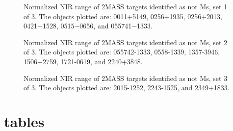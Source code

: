 \documentclass[12pt,preprint]{aastex}
\begin{document}

\begin{figure}
	\caption{Normalized NIR range of 2MASS targets identified as not Ms, set 1 of 3. The objects plotted are: 0011+5149, 0256+1935, 0256+2013, 0421+1528, 0515$-$0656, and 055741$-$1333.}
	\label{fig:notMs_1}
\end{figure}

\begin{figure}
	\caption{Normalized NIR range of 2MASS targets identified as not Ms, set 2 of 3. The objects plotted are: 055742-1333, 0558-1339, 1357-3946, 1506+2759, 1721-0619, and 2240+3848.}
	\label{fig:notMs_2}
\end{figure}

\begin{figure}
	\caption{Normalized NIR range of 2MASS targets identified as not Ms, set 3 of 3. The objects plotted are: 2015-1252, 2243-1525, and 2349+1833.}
	\label{fig:notMs_3}
\end{figure}

\clearpage

\section{tables}


\clearpage


\clearpage



\clearpage


\clearpage


\clearpage


\clearpage



\clearpage

%
\clearpage


\clearpage

\end{document}
